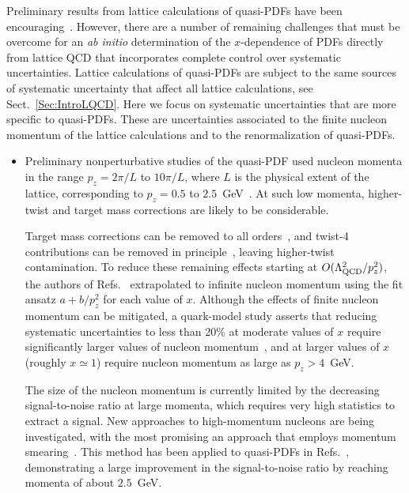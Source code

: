 Preliminary results from lattice calculations of quasi-PDFs have been 
encouraging~\cite{Lin:2014zya,Alexandrou:2015rja,Chen:2016utp,
Alexandrou:2016jqi}. 
%
However, there are a number of remaining challenges that must be overcome for 
an {\it ab initio} determination of the $x$-dependence of PDFs directly from 
lattice QCD that incorporates complete control over systematic uncertainties. 
%
Lattice calculations of quasi-PDFs are subject to the same sources of 
systematic uncertainty that affect all lattice calculations, see 
Sect.~\ref{Sec:IntroLQCD}. 
%
Here we focus on systematic uncertainties that are more specific to quasi-PDFs.
%
These are uncertainties associated to the finite nucleon momentum of the 
lattice calculations and to the renormalization of quasi-PDFs.

\begin{itemize}

\item Preliminary nonperturbative studies of the quasi-PDF used nucleon 
momenta in the range $p_z = 2\pi/L$ to $10\pi/L$, where $L$ is the physical 
extent of the lattice, corresponding to $p_z = 0.5$ to 
$2.5$~GeV~\cite{Lin:2014zya,Alexandrou:2015rja,Chen:2016utp,Alexandrou:2016jqi}.
%
At such low momenta, higher-twist and target mass corrections are likely to be 
considerable.

Target mass corrections can be removed to all orders~\cite{Chen:2016utp}, and 
twist-4 contributions can be removed in 
principle~\cite{Chen:2016utp,Radyushkin:2016hsy}, leaving higher-twist 
contamination. 
%
To reduce these remaining effects starting at $O(\Lambda_{\rm QCD}^2/p_z^2)$, 
the authors of Refs.~\cite{Lin:2014zya,Chen:2016utp} extrapolated to infinite 
nucleon momentum using the fit ansatz $a + b/p_z^2$ for each value of $x$. 
%
Although the effects of finite nucleon momentum can be mitigated, a quark-model 
study asserts that reducing systematic uncertainties to less than 20\% at 
moderate values of $x$ require significantly larger values of nucleon 
momentum~\cite{Gamberg:2014zwa}, and at larger values of $x$ 
(roughly $x\simeq 1$) require nucleon momentum as large as $p_z > 4$~GeV.

The size of the nucleon momentum is currently limited by the decreasing 
signal-to-noise ratio at large momenta, which requires very high statistics 
to extract a signal. 
%
New approaches to high-momentum nucleons are being investigated, with the most 
promising an approach that employs momentum smearing~\cite{Bali:2016lva}. 
%
This method has been applied to quasi-PDFs in 
Refs.~\cite{Alexandrou:2016jqi,Green:2017xeu}, demonstrating a large 
improvement in the signal-to-noise ratio by reaching momenta of about $2.5$~GeV.


\end{itemize}
